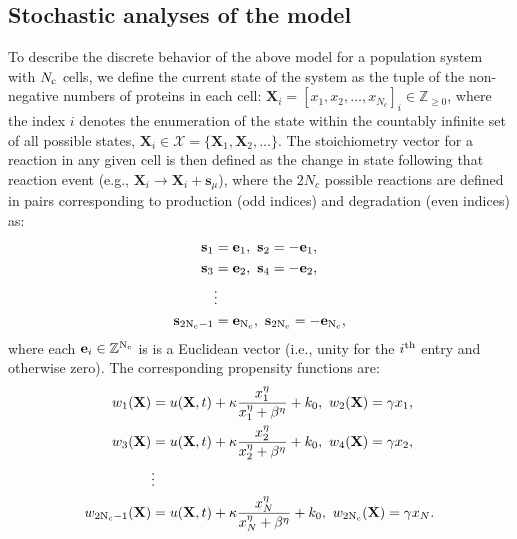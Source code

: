 \documentclass[12pt]{article}
\begin{document}
\subsection{Stochastic analyses of the model}
To describe the discrete behavior of the above model for a population system with $N_{\rm c}$ cells, we define the current state of the system as the tuple of the non-negative numbers of proteins in each cell: $\mathbf{X}_i = [x_{1},x_{2},\ldots,x_{N_c}]_i\in \mathbb{Z}_{\ge 0}$, where the index $i$ denotes the enumeration of the state within the countably infinite set of all possible states, $\mathbf{X}_i\in\mathcal{X}=\{\mathbf{X}_1,\mathbf{X}_2,\ldots\}$.
The stoichiometry vector for a reaction in any given cell is then defined as the change in state following that reaction event (e.g., $\mathbf{X}_i \rightarrow \mathbf{X}_i + \mathbf{s}_\mu$), where the $2N_c$ possible reactions are defined in pairs corresponding to production (odd indices) and degradation (even indices) as:
\begin{align}
\mathbf{s}_1 &= \mathbf{e}_1,\ \mathbf{s}_2 = -\mathbf{e}_1,\nonumber\\ 
\mathbf{s}_3 &= \mathbf{e}_2,\ \mathbf{s}_4 = -\mathbf{e}_2,\nonumber\\
&\vdots \nonumber\\ 
\mathbf{s}_{\rm 2N_c-1} &= \mathbf{e}_{\rm N_c},\ \mathbf{s}_{\rm 2N_c} = -\mathbf{e}_{\rm N_c}, \label{Stochs}
 \end{align}
where each $\mathbf{e}_{i}\in\mathbb{Z}^{{\rm N_ c}}$ is is a Euclidean vector (i.e., unity for the $i^{\rm th}$ entry and otherwise zero). The corresponding propensity functions are:
\begin{align}
w_1(\mathbf{X}) &= u(\mathbf{X},t)  + \kappa \frac{x_1^\eta}{x_1^{\eta}+\beta^{\eta}} + k_0,\ w_2(\mathbf{X}) = \gamma x_1,\nonumber\\
w_3(\mathbf{X}) &= u(\mathbf{X},t)  + \kappa \frac{x_2^\eta}{x_2^{\eta}+\beta^{\eta}} + k_0,\ w_4(\mathbf{X}) = \gamma x_2,\nonumber\\
&\vdots \nonumber\\
w_{\rm 2N_c-1}(\mathbf{X}) &= u(\mathbf{X},t)  + \kappa \frac{x_N^\eta}{x_N^{\eta}+\beta^{\eta}} + k_0,\ w_{\rm 2N_c}(\mathbf{X}) = \gamma x_N.\label{Props}
 \end{align}
\end{document}
